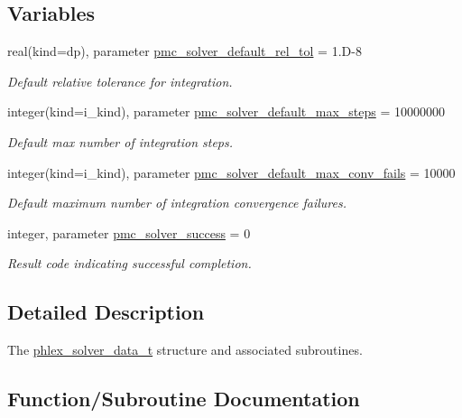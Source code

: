 \subsection*{Variables}
\begin{DoxyCompactItemize}
\item 
real(kind=dp), parameter \mbox{\hyperlink{namespacepmc__phlex__solver__data_a680944ec13286ae1045e6d9ba2e630b6}{pmc\+\_\+solver\+\_\+default\+\_\+rel\+\_\+tol}} = 1.\+D-\/8
\begin{DoxyCompactList}\small\item\em Default relative tolerance for integration. \end{DoxyCompactList}\item 
integer(kind=i\+\_\+kind), parameter \mbox{\hyperlink{namespacepmc__phlex__solver__data_a62a47f32de1d137a90a46c5fb6716347}{pmc\+\_\+solver\+\_\+default\+\_\+max\+\_\+steps}} = 10000000
\begin{DoxyCompactList}\small\item\em Default max number of integration steps. \end{DoxyCompactList}\item 
integer(kind=i\+\_\+kind), parameter \mbox{\hyperlink{namespacepmc__phlex__solver__data_ad1ee88ba9b3c6a966bacb508b9be226b}{pmc\+\_\+solver\+\_\+default\+\_\+max\+\_\+conv\+\_\+fails}} = 10000
\begin{DoxyCompactList}\small\item\em Default maximum number of integration convergence failures. \end{DoxyCompactList}\item 
integer, parameter \mbox{\hyperlink{namespacepmc__phlex__solver__data_a0f2dcefeefc3ce9e4eb9e337c5203054}{pmc\+\_\+solver\+\_\+success}} = 0
\begin{DoxyCompactList}\small\item\em Result code indicating successful completion. \end{DoxyCompactList}\end{DoxyCompactItemize}


\subsection{Detailed Description}
The \mbox{\hyperlink{structpmc__phlex__solver__data_1_1phlex__solver__data__t}{phlex\+\_\+solver\+\_\+data\+\_\+t}} structure and associated subroutines. 

\subsection{Function/\+Subroutine Documentation}
\mbox{\label{namespacepmc__phlex__solver__data_a30e0f4b080777d62bb7ee6c91f8612f5}} 
